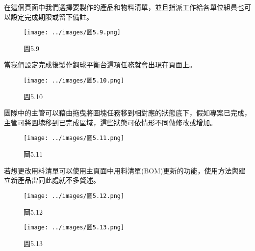 在這個頁面中我們選擇要製作的產品和物料清單，並且指派工作給各單位組員也可以設定完成期限或留下備註。

\begin{figure}[h]
\centering
\texttt{[image: ../images/圖5.9.png]}
\caption{圖5.9}
\end{figure}

當我們設定完成後製作鋼球平衡台這項任務就會出現在頁面上。

\begin{figure}[h]
\centering
\texttt{[image: ../images/圖5.10.png]}
\caption{圖5.10}
\end{figure}

團隊中的主管可以藉由拖曳將圖塊任務移到相對應的狀態底下，假如專案已完成，主管可將圖塊移到已完成區域，這些狀態可依情形不同做修改或增加。

\begin{figure}[h]
\centering
\texttt{[image: ../images/圖5.11.png]}
\caption{圖5.11}
\end{figure}

若想更改用料清單可以使用主頁面中用料清單(BOM)更新的功能，使用方法與建立新產品雷同此處就不多贅述。

\begin{figure}[h]
\centering
\texttt{[image: ../images/圖5.12.png]}
\caption{圖5.12}
\end{figure}

\begin{figure}[h]
\centering
\texttt{[image: ../images/圖5.13.png]}
\caption{圖5.13}
\end{figure}